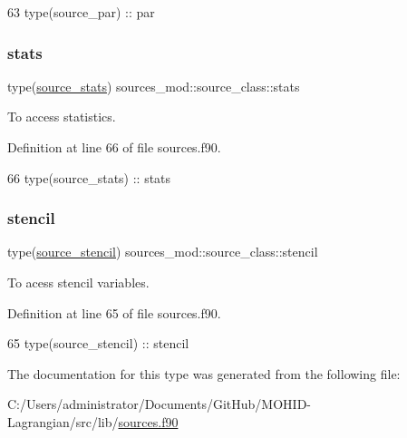 \begin{DoxyCode}
63         \textcolor{keywordtype}{type}(source\_par)   :: par
\end{DoxyCode}
\mbox{\label{structsources__mod_1_1source__class_a2ed110f187434e6b6345f21822993517}} 
\subsubsection{\texorpdfstring{stats}{stats}}
{\footnotesize\ttfamily type(\mbox{\hyperlink{structsources__mod_1_1source__stats}{source\+\_\+stats}}) sources\+\_\+mod\+::source\+\_\+class\+::stats\hspace{0.3cm}{\ttfamily [private]}}



To access statistics. 



Definition at line 66 of file sources.\+f90.


\begin{DoxyCode}
66         \textcolor{keywordtype}{type}(source\_stats) :: stats
\end{DoxyCode}
\mbox{\label{structsources__mod_1_1source__class_a7950d4033c4b4be466479fc8a11dad1c}} 
\subsubsection{\texorpdfstring{stencil}{stencil}}
{\footnotesize\ttfamily type(\mbox{\hyperlink{structsources__mod_1_1source__stencil}{source\+\_\+stencil}}) sources\+\_\+mod\+::source\+\_\+class\+::stencil\hspace{0.3cm}{\ttfamily [private]}}



To acess stencil variables. 



Definition at line 65 of file sources.\+f90.


\begin{DoxyCode}
65         \textcolor{keywordtype}{type}(source\_stencil) :: stencil
\end{DoxyCode}


The documentation for this type was generated from the following file\+:\begin{DoxyCompactItemize}
\item 
C\+:/\+Users/administrator/\+Documents/\+Git\+Hub/\+M\+O\+H\+I\+D-\/\+Lagrangian/src/lib/\mbox{\hyperlink{sources_8f90}{sources.\+f90}}\end{DoxyCompactItemize}
